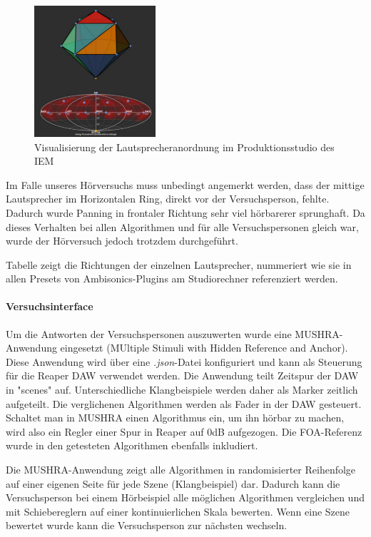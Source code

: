 \begin{figure}[!ht]
  \centering
  \includegraphics[width=0.4\textwidth]{aufbau/plots/speaker_pos_prod_studio.png}
  \caption{Visualisierung der Lautsprecheranordnung im Produktionsstudio des IEM \protect\footnotemark}
  \label{fig:aufb:prodstud}
\end{figure}


Im Falle unseres Hörversuchs muss unbedingt angemerkt werden, dass der mittige Lautsprecher im Horizontalen Ring, direkt vor der Versuchsperson, fehlte. Dadurch wurde Panning in frontaler Richtung sehr viel hörbarerer sprunghaft. Da dieses Verhalten bei allen Algorithmen und für alle Versuchspersonen gleich war, wurde der Hörversuch jedoch trotzdem durchgeführt.

Tabelle zeigt die Richtungen der einzelnen Lautsprecher, nummeriert wie sie in allen Presets von Ambisonics-Plugins am Studiorechner referenziert werden.



\paragraph{Versuchsinterface}
Um die Antworten der Versuchspersonen auszuwerten wurde eine MUSHRA-Anwendung eingesetzt (MUltiple Stimuli with Hidden Reference and Anchor). Diese Anwendung wird über eine \textit{.json}-Datei konfiguriert und kann als Steuerung für die Reaper DAW verwendet werden. Die Anwendung teilt Zeitspur der DAW in "scenes" auf. Unterschiedliche Klangbeispiele werden daher als Marker zeitlich aufgeteilt. Die verglichenen Algorithmen werden als Fader in der DAW gesteuert. Schaltet man in MUSHRA einen Algorithmus ein, um ihn hörbar zu machen, wird also ein Regler einer Spur in Reaper auf 0dB aufgezogen. Die FOA-Referenz wurde in den getesteten Algorithmen ebenfalls inkludiert.

Die MUSHRA-Anwendung zeigt alle Algorithmen in randomisierter Reihenfolge auf einer eigenen Seite für jede Szene (Klangbeispiel) dar. Dadurch kann die Versuchsperson bei einem Hörbeispiel alle möglichen Algorithmen vergleichen und mit Schiebereglern auf einer kontinuierlichen Skala bewerten. Wenn eine Szene bewertet wurde kann die Versuchsperson zur nächsten wechseln.